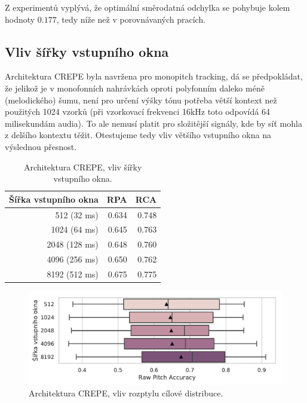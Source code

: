 Z experimentů vyplývá, že optimální směrodatná odchylka se pohybuje kolem hodnoty $0.177$, tedy níže než v porovnávaných pracích. 


\subsection{Vliv šířky vstupního okna}

Architektura CREPE byla navržena pro monopitch tracking, dá se předpokládat, že jelikož je v monofonních nahrávkách oproti polyfonním daleko méně (melodického) šumu, není pro určení výšky tónu potřeba větší kontext než použitých 1024 vzorků (při vzorkovací frekvenci 16kHz toto odpovídá 64 milisekundám audia). To ale nemusí platit pro složitější signály, kde by síť mohla z delšího kontextu těžit. Otestujeme tedy vliv většího vstupního okna na výslednou přesnost.


\begin{table}[h!]
\centering
    \begin{tabular}{rrr}
    \toprule
    Šířka vstupního okna &   RPA &   RCA \\
    \midrule
    512 (32 ms)   & 0.634 & 0.748 \\
    1024 (64 ms)  & 0.645 & 0.763 \\
    2048 (128 ms) & 0.648 & 0.760 \\
    4096 (256 ms) & 0.650 & 0.762 \\
    8192 (512 ms) & 0.675 & 0.775 \\
    \bottomrule
    \end{tabular}

\caption{Architektura CREPE, vliv šířky vstupního okna.}\label{tab:crepe_sirka}
\end{table}

\begin{figure}[h]\centering
    \includegraphics[scale=0.6]{../img/figures/crepe_sirka.pdf}
\caption{Architektura CREPE, vliv rozptylu cílové distribuce.}\label{obr:crepe_sirka}
\end{figure}

